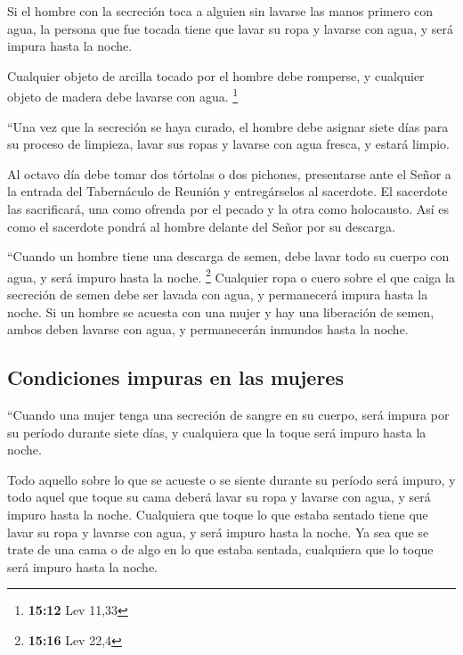  Si el hombre con la secreción toca a alguien sin lavarse
las manos primero con agua, la persona que fue tocada tiene que lavar su
ropa y lavarse con agua, y será impura hasta la noche.

 Cualquier objeto de arcilla tocado por el hombre debe
romperse, y cualquier objeto de madera debe lavarse con agua.
\footnote{\textbf{15:12} Lev 11,33}

 ``Una vez que la secreción se haya curado, el hombre
debe asignar siete días para su proceso de limpieza, lavar sus ropas y
lavarse con agua fresca, y estará limpio.

 Al octavo día debe tomar dos tórtolas o dos pichones,
presentarse ante el Señor a la entrada del Tabernáculo de Reunión y
entregárselos al sacerdote.  El sacerdote las
sacrificará, una como ofrenda por el pecado y la otra como holocausto.
Así es como el sacerdote pondrá al hombre delante del Señor por su
descarga.

 ``Cuando un hombre tiene una descarga de semen, debe
lavar todo su cuerpo con agua, y será impuro hasta la noche. \footnote{\textbf{15:16}
  Lev 22,4}  Cualquier ropa o cuero sobre el que caiga la
secreción de semen debe ser lavada con agua, y permanecerá impura hasta
la noche.  Si un hombre se acuesta con una mujer y hay
una liberación de semen, ambos deben lavarse con agua, y permanecerán
inmundos hasta la noche.

\hypertarget{condiciones-impuras-en-las-mujeres}{%
\subsection{Condiciones impuras en las
mujeres}\label{condiciones-impuras-en-las-mujeres}}

 ``Cuando una mujer tenga una secreción de sangre en su
cuerpo, será impura por su período durante siete días, y cualquiera que
la toque será impuro hasta la noche.

 Todo aquello sobre lo que se acueste o se siente durante
su período será impuro,  y todo aquel que toque su cama
deberá lavar su ropa y lavarse con agua, y será impuro hasta la noche.
 Cualquiera que toque lo que estaba sentado tiene que
lavar su ropa y lavarse con agua, y será impuro hasta la noche.
 Ya sea que se trate de una cama o de algo en lo que
estaba sentada, cualquiera que lo toque será impuro hasta la noche.

